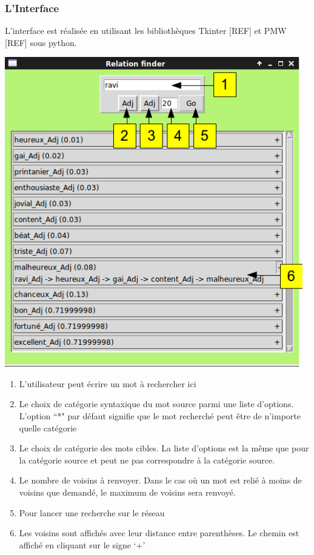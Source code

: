 \subsubsection{L'Interface}

L'interface est réalisée en utilisant les bibliothèques Tkinter [REF] et PMW 
[REF] sous python.

\begin{center}
\includegraphics[width=13cm]{relationfinderinterface.png}
\end{center}

\begin{enumerate}
    \item{L'utilisateur peut écrire un mot à rechercher ici}
    \item{Le choix de catégorie syntaxique du mot source parmi une liste 
    d'options. L'option ``*" par défaut signifie que le mot recherché peut être 
    de n'importe quelle catégorie}
    \item{Le choix de catégorie des mots cibles. La liste d'options est la même 
    que pour la catégorie source et peut ne pas correspondre à la catégorie 
    source.}
    \item{Le nombre de voisins à renvoyer. Dans le cas où un mot est relié à 
    moins de voisins que demandé, le maximum de voisins sera renvoyé.}
    \item{Pour lancer une recherche sur le réseau}
    \item{Les voisins sont affichés avec leur distance entre parenthèses. Le 
    chemin est affiché en cliquant sur le signe \lq{+}\rq{}}   

\end{enumerate}

